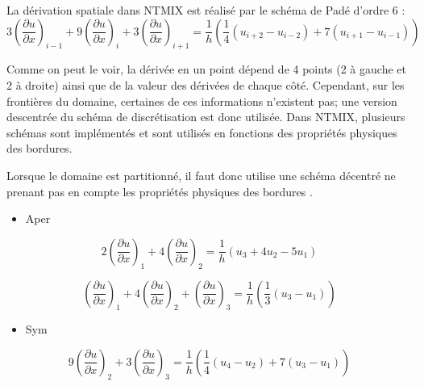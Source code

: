 
La dérivation spatiale dans NTMIX est réalisé par le schéma de Padé d'ordre 6 \cite{Hirsch:1988:NCI:63653}:
$$3\left( \frac{\partial u}{\partial x}\right) _{i-1} + 9\left( \frac{\partial u}{\partial x}\right) _{i} + 3\left( \frac{\partial u}{\partial x}\right) _{i+1} = \frac{1}{h}\left(  \frac{1}{4} \left( u_{i+2}-u_{i-2} \right) + 7 \left( u_{i+1} - u_{i-1} \right) \right) $$


Comme on peut le voir, la dérivée en un point dépend de 4 points (2 à gauche et 2 à droite) ainsi que de la valeur des dérivées de chaque côté. Cependant, sur les frontières du domaine, certaines de ces informations n'existent pas; une version descentrée du schéma de discrétisation est donc utilisée. Dans NTMIX, plusieurs schémas sont implémentés et sont utilisés en fonctions des propriétés physiques des bordures.

Lorsque le domaine est partitionné, il faut donc utilise une schéma décentré ne prenant pas en compte les propriétés physiques des bordures \cite{Stoessel:1994:DNS:199617.199626} .



\begin{itemize}
\item Aper
\end{itemize}
 


$$2\left( \frac{\partial u}{\partial x}\right) _{1} + 4\left( \frac{\partial u}{\partial x}\right) _{2} = \frac{1}{h}\left( u_3 + 4u_2 - 5u_1 \right)$$

$$\left( \frac{\partial u}{\partial x}\right) _{1} + 4\left( \frac{\partial u}{\partial x}\right) _{2} + \left( \frac{\partial u}{\partial x}\right) _{3} = \frac{1}{h}\left( \frac{1}{3} \left( u_3 - u_1 \right) \right)$$

\begin{itemize}
\item Sym
\end{itemize}

$$9\left( \frac{\partial u}{\partial x}\right) _{2} + 3\left( \frac{\partial u}{\partial x}\right) _{3} = \frac{1}{h}\left( \frac{1}{4} \left( u_4 - u_2 \right) + 7 \left( u_3 - u_1 \right) \right)$$

